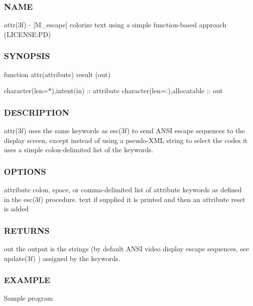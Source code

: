 \subsubsection*{N\+A\+ME}

attr(3f) -\/ \mbox{[}M\+\_\+escape\mbox{]} colorize text using a simple function-\/based approach (L\+I\+C\+E\+N\+SE\+:PD) \subsubsection*{S\+Y\+N\+O\+P\+S\+IS}

function attr(attribute) result (out)

character(len=$\ast$),intent(in) \+:\+: attribute character(len=\+:),allocatable \+:\+: out \subsubsection*{D\+E\+S\+C\+R\+I\+P\+T\+I\+ON}

attr(3f) uses the same keywords as esc(3f) to send A\+N\+SI escape sequences to the display screen, except instead of using a pseudo-\/\+X\+ML string to select the codes it uses a simple colon-\/delimited list of the keywords. \subsubsection*{O\+P\+T\+I\+O\+NS}

attribute colon, space, or comma-\/delimited list of attribute keywords as defined in the esc(3f) procedure. text if supplied it is printed and then an attribute reset is added \subsubsection*{R\+E\+T\+U\+R\+NS}

out the output is the strings (by default A\+N\+SI video display escape sequences, see update(3f) ) assigned by the keywords. \subsubsection*{E\+X\+A\+M\+P\+LE}

Sample program

